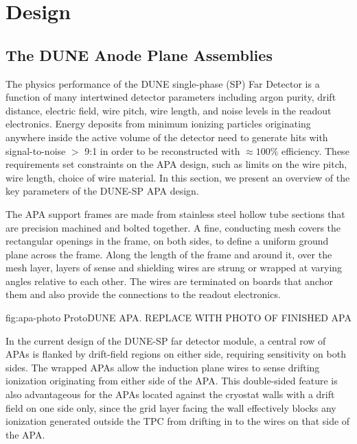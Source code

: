 \section{Design} %
\label{sec:fdsp-apa-design}


\subsection{The DUNE Anode Plane Assemblies}

The physics performance of the DUNE single-phase (SP) Far Detector is a function of many intertwined detector parameters including argon purity, drift distance, electric field, wire pitch, wire length, and noise levels in the readout electronics.  Energy deposits from minimum ionizing particles originating anywhere inside the active volume of the detector need to generate hits with signal-to-noise $>$ 9:1 in order to be reconstructed with $\approx 100\%$ efficiency.  These requirements set constraints on the APA design, such as limits on the wire pitch, wire length, choice of wire material.  In this section, we present an overview of the key parameters of the DUNE-SP APA design. 

The APA support frames are made from stainless steel hollow tube sections that are precision machined and bolted together. A fine, conducting mesh covers the rectangular openings in the frame, on both sides, to define a uniform ground plane across the frame. Along the length of the frame and around it, over the mesh layer, layers of sense and shielding wires are strung or wrapped at varying angles relative to each other. The wires are terminated on boards that anchor them and also provide the connections to the readout electronics. 

\begin{dunefigure}{fig:apa-photo}
{ProtoDUNE APA. REPLACE WITH PHOTO OF FINISHED APA}
\setlength{\fboxsep}{0pt}
\setlength{\fboxrule}{0.5pt}
\end{dunefigure}

In the current design of the DUNE-SP far detector module, a central row of APAs is flanked by drift-field regions on either side, requiring sensitivity on both sides. The wrapped APAs allow the induction plane wires to sense drifting ionization originating from either side of the APA.  This double-sided feature is also advantageous for the APAs located against the cryostat walls with a drift field on one side only, since the grid layer facing the wall effectively blocks any ionization generated outside the TPC from drifting in to the wires on that side of the APA.  

